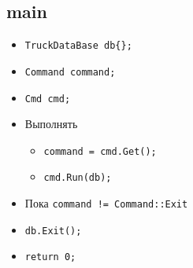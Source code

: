 \subsection*{main}

\begin{itemize}
	\item \verb|TruckDataBase db{};|
    \item \verb|Command command;|
    \item \verb|Cmd cmd;|
    \item Выполнять
		\begin{itemize}
			\item \verb|command = cmd.Get();|
			\item \verb|cmd.Run(db);|
		\end{itemize}
    \item Пока \verb|command != Command::Exit|
    \item \verb|db.Exit();|
    \item \verb|return 0;|
\end{itemize}